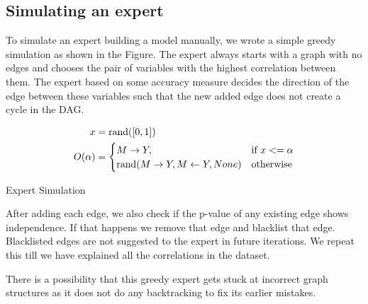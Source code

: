 \documentclass{article}
\begin{document}
\subsection{Simulating an expert}
To simulate an expert building a model manually, we wrote a simple greedy simulation as shown in the Figure. The expert always starts with a graph with
no edges and chooses the pair of variables with the highest correlation between them. The expert based on some accuracy measure decides the direction
of the edge between these variables such that the new added edge does not create a cycle in the DAG.


\begin{equation}
	\begin{split}
		x &= \textnormal{rand}([0, 1]) \\
		O(\alpha) &= \begin{cases} 
			M \rightarrow Y, & \textnormal{if  } x <= \alpha \\
			\textnormal{rand}(M \rightarrow Y, M \leftarrow Y, None) & \textnormal{otherwise} \\
				\end{cases} \\
	\end{split}
\end{equation}

\begin{algorithm}
	\caption{Expert Simulation}

\end{algorithm}

After adding each edge, we also check if the p-value of any existing edge shows independence. If that happens we remove that edge and blacklist that edge. 
Blacklisted edges are not suggested to the expert in future iterations. We repeat this till we have explained all the correlations in the dataset.

There is a possibility that this greedy expert gets stuck at incorrect graph structures as it does not do any backtracking to fix its earlier mistakes.
\end{document}
